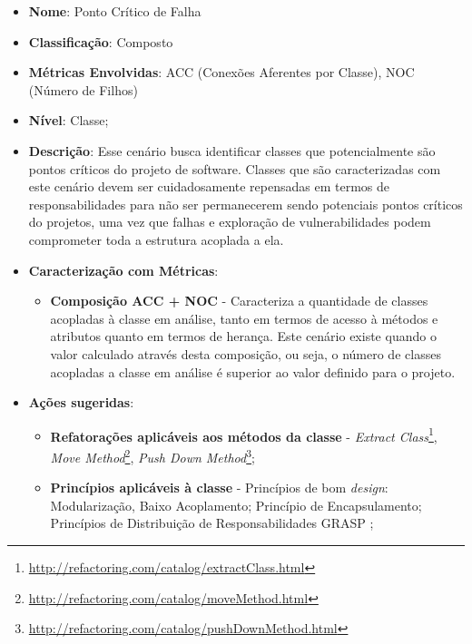 \begin{itemize}
\item \textbf{Nome}: Ponto Crítico de Falha
\item \textbf{Classificação}: Composto
\item \textbf{Métricas Envolvidas}: ACC (Conexões Aferentes por Classe), NOC (Número de Filhos)
\item \textbf{Nível}: Classe;
\item \textbf{Descrição}: Esse cenário busca identificar classes que potencialmente são pontos críticos do projeto de software. Classes que são caracterizadas com este cenário devem ser cuidadosamente repensadas em termos de responsabilidades para não ser permanecerem sendo potenciais pontos críticos do projetos, uma vez que falhas e exploração de vulnerabilidades podem comprometer toda a estrutura acoplada a ela.
\item \textbf{Caracterização com Métricas}: 
	\begin{itemize}
	\item \textbf{Composição ACC + NOC} - Caracteriza a quantidade de classes acopladas à classe em análise, tanto em termos de acesso à métodos e atributos quanto em termos de herança. Este cenário existe quando o valor calculado através desta composição, ou seja, o número de classes acopladas a classe em análise é superior ao valor definido para o projeto.
	\end{itemize}
\item \textbf{Ações sugeridas}: 
	\begin{itemize}
	\item \textbf{Refatorações aplicáveis aos métodos da classe} - \emph{Extract Class}\footnote{\url{http://refactoring.com/catalog/extractClass.html}}, \emph{Move Method}\footnote{\url{http://refactoring.com/catalog/moveMethod.html}}, \emph{Push Down Method}\footnote{\url{http://refactoring.com/catalog/pushDownMethod.html}};
	\item \textbf{Princípios aplicáveis à classe} - Princípios de bom \emph{design}: Modularização, Baixo Acoplamento; Princípio de Encapsulamento; Princípios de Distribuição de Responsabilidades GRASP \cite{larman2007};
	\end{itemize}
\end{itemize}



